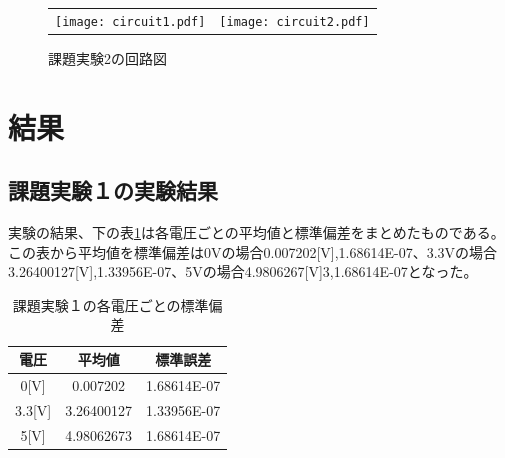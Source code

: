 \documentclass[11pt,dvipdfmx]{jarticle}
\begin{document}
\begin{figure}[b]
\begin{tabular}{cc}
\begin{minipage}[c]{0.5\linewidth}
					\end{minipage}
					\newpage

					\begin{minipage}[c]{0.5\linewidth}
						\centering
						\texttt{[image: circuit1.pdf]}
						\caption{課題実験1の回路図}
						\label{fig:circuit1}
						
					\end{minipage}&
		
					\begin{minipage}[c]{0.5\linewidth}
						\centering
						\texttt{[image: circuit2.pdf]}
						\caption{課題実験2の回路図}
						\label{fig:circuit2}
						
					\end{minipage}


				\end{tabular}
			\end{figure}


\section{結果}
	\subsection{課題実験１の実験結果}
		実験の結果、下の表\ref{tab:hensa}は各電圧ごとの平均値と標準偏差をまとめたものである。
		この表から平均値を標準偏差は0Vの場合0.007202[V],1.68614E-07、3.3Vの場合3.26400127[V],1.33956E-07、5Vの場合4.9806267[V]3,1.68614E-07となった。



		\begin{table}[hbtp]
			\caption{課題実験１の各電圧ごとの標準偏差}
			\centering
			\label{tab:hensa}
			\begin{tabular}{|c|c|c|}
				\hline
				電圧	&	平均値	&	標準誤差\\
				\hline \hline
				0[V]		&0.007202&	1.68614E-07\\
				\hline
				3.3[V]	&3.26400127&	1.33956E-07\\
				\hline
				5[V]		&4.98062673&	1.68614E-07\\
				\hline
			\end{tabular}
		\end{table}
\end{document}
